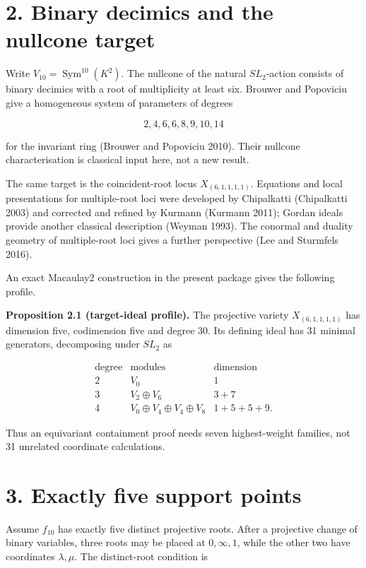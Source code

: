 \documentclass[
  11pt,
]{article}
\begin{document}
\section{2. Binary decimics and the nullcone
target}\label{binary-decimics-and-the-nullcone-target}

Write \(V_{10}=\operatorname{Sym}^{10}(K^2)\). The nullcone of the
natural \(SL_2\)-action consists of binary decimics with a root of
multiplicity at least six. Brouwer and Popoviciu give a homogeneous
system of parameters of degrees

\[
2,4,6,6,8,9,10,14
\]

for the invariant ring (Brouwer and Popoviciu 2010). Their nullcone
characterisation is classical input here, not a new result.

The same target is the coincident-root locus \(X_{(6,1,1,1,1)}\).
Equations and local presentations for multiple-root loci were developed
by Chipalkatti (Chipalkatti 2003) and corrected and refined by Kurmann
(Kurmann 2011); Gordan ideals provide another classical description
(Weyman 1993). The conormal and duality geometry of multiple-root loci
gives a further perspective (Lee and Sturmfels 2016).

An exact Macaulay2 construction in the present package gives the
following profile.

\textbf{Proposition 2.1 (target-ideal profile).} The projective variety
\(X_{(6,1,1,1,1)}\) has dimension five, codimension five and degree 30.
Its defining ideal has 31 minimal generators, decomposing under \(SL_2\)
as

\[
\begin{array}{c|c|c}
\text{degree}&\text{modules}&\text{dimension}\\ \hline
2&V_0&1\\
3&V_2\oplus V_6&3+7\\
4&V_0\oplus V_4\oplus V_4\oplus V_8&1+5+5+9.
\end{array}
\tag{2.1}
\]

Thus an equivariant containment proof needs seven highest-weight
families, not 31 unrelated coordinate calculations.

\section{3. Exactly five support
points}\label{exactly-five-support-points}

Assume \(f_{10}\) has exactly five distinct projective roots. After a
projective change of binary variables, three roots may be placed at
\(0,\infty,1\), while the other two have coordinates \(\lambda,\mu\).
The distinct-root condition is
\end{document}
